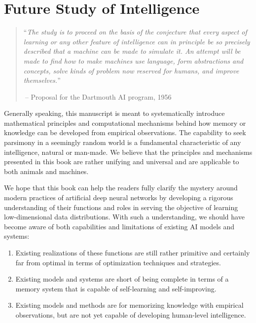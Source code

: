 \documentclass[../../book-main.tex]{subfiles}
\begin{document}
\chapter{Future Study of Intelligence}
\label{ch:future}


  

\begin{quote}
``{\em The study is to proceed on the basis of the conjecture that every aspect of learning or any other feature of intelligence can in principle be so precisely described that a machine can be made to simulate it. An attempt will be made to find how to make machines use language, form abstractions and concepts, solve kinds of problem now reserved for humans, and improve themselves.}''

$~$\hfill -- Proposal for the Dartmouth AI program, 1956
 \end{quote}
\vspace{5mm}


Generally speaking, this manuscript is meant to systematically introduce mathematical principles and computational mechanisms behind how memory or knowledge can be developed from empirical observations. The capability to seek parsimony in a seemingly random world is a fundamental characteristic of any intelligence, natural or man-made. We believe that the principles and mechanisms presented in this book are rather unifying and universal and are applicable to both animals and machines. 

We hope that this book can help the readers fully clarify the mystery around modern practices of artificial deep neural networks by developing a rigorous understanding of their functions and roles in serving the objective of learning low-dimensional data distributions. With such a understanding, we should have become aware of both capabilities and limitations of existing AI models and systems: 
\begin{enumerate}
    \item Existing realizations of these functions are still rather primitive and certainly far from optimal in terms of optimization techniques and strategies. 
    \item Existing models and systems are short of being complete in terms of a memory system that is capable of self-learning and self-improving.
    \item Existing models and methods are for memorizing knowledge with empirical observations, but are not yet capable of developing human-level intelligence.
\end{enumerate} 
\end{document}
